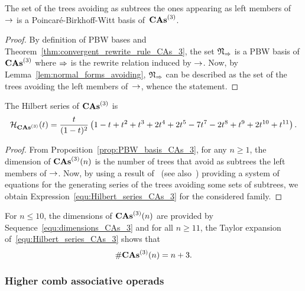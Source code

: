 \begin{Proposition} \label{prop:PBW_basis_CAs_3}
    The set of the trees avoiding as subtrees the ones appearing as
    left members of $\operatorname{\to}$ is a Poincaré-Birkhoff-Witt basis
    of~$\mathbf{CAs}^{\left(3\right)}$.
\end{Proposition}
\begin{proof}
    By definition of PBW bases and
    Theorem~\ref{thm:convergent_rewrite_rule_CAs_3}, the set
    $\mathfrak{N}_{\operatorname{\Rightarrow}}$ is a PBW basis of $\mathbf{CAs}^{\left(3\right)}$ where
    $\operatorname{\Rightarrow}$ is the rewrite relation induced by $\operatorname{\to}$. Now, by
    Lemma~\ref{lem:normal_forms_avoiding}, $\mathfrak{N}_{\operatorname{\Rightarrow}}$
    can be described as the set of the trees avoiding the left members
    of~$\operatorname{\to}$, whence the statement.
\end{proof}
\medbreak

\begin{Proposition} \label{prop:Hilbert_series_CAs_3}
    The Hilbert series of $\mathbf{CAs}^{\left(3\right)}$ is
    \begin{equation} \label{equ:Hilbert_series_CAs_3}
        \mathcal{H}_{\mathbf{CAs}^{\left(3\right)}}(t) = \frac{t}{(1 - t)^2}
        \left(1 - t + t^2 + t^3 + 2t^4 + 2t^5 - 7t^7 - 2t^8 + t^9 +
        2t^{10} + t^{11}\right).
    \end{equation}
\end{Proposition}
\begin{proof}
    From Proposition~\ref{prop:PBW_basis_CAs_3}, for any $n \geq 1$, the
    dimension of $\mathbf{CAs}^{\left(3\right)}(n)$ is the number of trees that avoid as
    subtrees the left members of $\operatorname{\to}$. Now, by using a result
    of~\cite{Gir18} (see also~\cite{Row10,KP15}) providing a system of
    equations for the generating series of the trees avoiding some sets
    of subtrees, we obtain Expression~\eqref{equ:Hilbert_series_CAs_3}
    for the considered family.
\end{proof}
\medbreak

For $n \leq 10$, the dimensions of $\mathbf{CAs}^{\left(3\right)}(n)$ are provided by
Sequence~\eqref{equ:dimensions_CAs_3} and for all $n \geq 11$, the
Taylor expansion of~\eqref{equ:Hilbert_series_CAs_3} shows that
\begin{equation}
  \# \mathbf{CAs}^{\left(3\right)}(n) = n + 3.
  \end{equation}
\medbreak


\subsubsection{Higher comb associative operads}
\label{sec:higher_comb_associative_operads}

